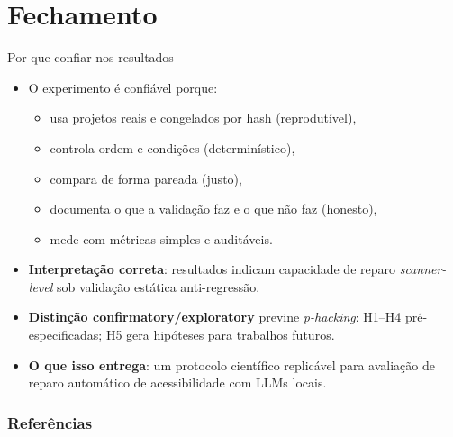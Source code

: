 \documentclass[aspectratio=169]{beamer}
\begin{document}
\section{Fechamento}

\begin{frame}{Por que confiar nos resultados}
\small
\begin{itemize}
  \item O experimento é confiável porque:
  \begin{itemize}
    \item usa projetos reais e congelados por hash (reprodutível),
    \item controla ordem e condições (determinístico),
    \item compara de forma pareada (justo),
    \item documenta o que a validação faz e o que não faz (honesto),
    \item mede com métricas simples e auditáveis.
  \end{itemize}
  \item \textbf{Interpretação correta}: resultados indicam capacidade de
        reparo \emph{scanner-level} sob validação estática anti-regressão.
  \item \textbf{Distinção confirmatory/exploratory} previne
        \emph{p-hacking}: H1--H4 pré-especificadas; H5 gera
        hipóteses para trabalhos futuros.
  \item \textbf{O que isso entrega}: um protocolo científico replicável para
        avaliação de reparo automático de acessibilidade com LLMs locais.
\end{itemize}
\end{frame}

\appendix
\begin{frame}[allowframebreaks]
  \frametitle{Referências}
  \nocite{*}
  
  
\end{frame}

\end{document}
